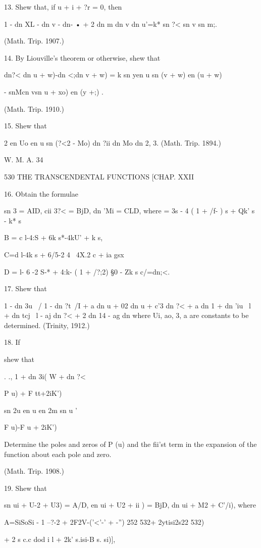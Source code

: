 13. Shew that, if u + i + ?r = 0, then

1 - dn XL - dn v - dn- • + 2 dn m dn v dn u'=k* sn ?< sn v sn m;.

(Math. Trip. 1907.)

14. By Liouville's theorem or otherwise, shew that

dn?< dn u + w)-dn <;dn v + w) = k sn yen u sn (v + w) en (u + w)

- snMcn vsn u + xo) en (y +;) .

(Math. Trip. 1910.)

15. Shew that

2 en Uo en u sn (?<2 - %
Mo) dn ?ii dn Mo dn %
2, 3. (Math. Trip. 1894.)

W. M. A. 34

530 THE TRANSCENDENTAL FUNCTIONS [CHAP. XXII

16. Obtain the formulae

sn 3 = AID, cii 3?< = BjD, dn 'Mi = CLD, where = 3s - 4 ( 1 + /f- ) s
+ Qk' s - k* s%

B = c l-4:S + 6k s*-4kU' + k s,

C=d l-4k s + 6/5-2 4 \ 4X.2 c + ia gsx

D = l- 6 -2 S-* + 4:k- ( 1 + /?;2) §0 - Zk s%
c/=dn;<.

17. Shew that

1 - dn 3u \ / 1 - dn ?t\ /I + a dn u + 02 dn u + c'3 dn ?< + a dn 1 +
dn 'iu \ l + dn tcj \ l - aj dn ?< + 2 dn 14 - ag dn %
where Ui, ao, 3, a are constants to be determined. (Trinity, 1912.)

18. If

shew that

  . ., 1 + dn 3i( W + dn ?<

P u) + F tt+2iK')

sn 2u en u en 2m sn u '

F u)-F u + 2iK')

Determine the poles and zeros of P (u) and the fii'st term in the
expansion of the function about each pole and zero.

(Math. Trip. 1908.)

19. Shew that

sn ui + U-2 + U3) = A/D, en ui + U2 + ii ) = BjD, dn ui + M2 + %
C'/i), where

A=SiSoSi - 1 --?-2 + 2F2V-('<'-' + -'') 252 532+ 2ytisi2s22 532)

+ 2 s c.c dod i l + 2k' s.isi-B s. si)],

